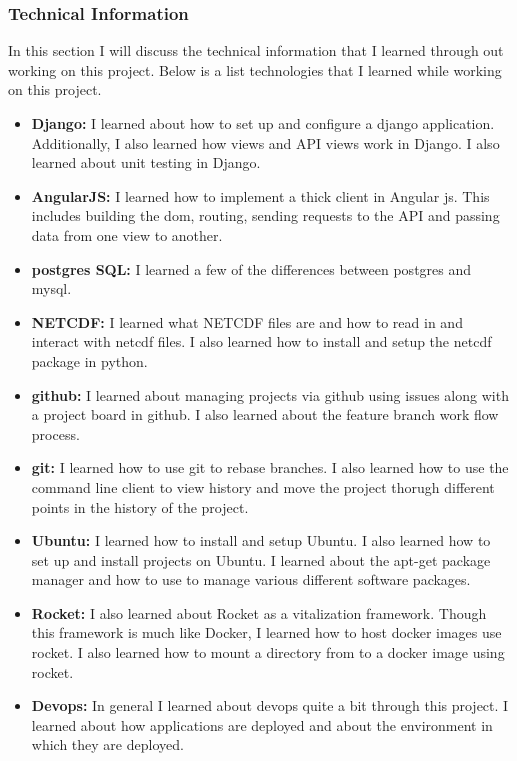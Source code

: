 \documentclass[onecolumn, draftclsnofoot,10pt, compsoc]{article}
\begin{document}
        \subsubsection{Technical Information}
        In this section I will discuss the technical information that I learned through out working on this project. Below is a list technologies that I learned while working on this project.\\
        \begin{itemize}
            \item \textbf{Django:} I learned about how to set up and configure a django application. Additionally, I also learned how views and API views work in Django. I also learned about unit testing in Django.\\
            \item \textbf{AngularJS:} I learned how to implement a thick client in Angular js. This includes building the dom, routing, sending requests to the API and passing data from one view to another.\\
            \item \textbf{postgres SQL:} I learned a few of the differences between postgres and mysql.\\
            \item \textbf{NETCDF:} I learned what NETCDF files are and how to read in and interact with netcdf files. I also learned how to install and setup the netcdf package in python.\\
            \item \textbf{github:} I learned about managing projects via github using issues along with a project board in github. I also learned about the feature branch work flow process.\\
            \item \textbf{git:} I learned how to use git to rebase branches. I also learned how to use the command line client to view history and move the project thorugh different points in the history of the project.\\
            \item \textbf{Ubuntu:} I learned how to install and setup Ubuntu. I also learned how to set up and install projects on Ubuntu. I learned about the apt-get package manager and how to use to manage various different software packages.\\
            \item \textbf{Rocket:} I also learned about Rocket as a vitalization framework. Though this framework is much like Docker, I learned how to host docker images use rocket. I also learned how to mount a directory from to a docker image using rocket.\\
            \item \textbf{Devops:} In general I learned about devops quite a bit through this project. I learned about how applications are deployed and about the environment in which they are deployed.\\
        \end{itemize}
        
\end{document}
